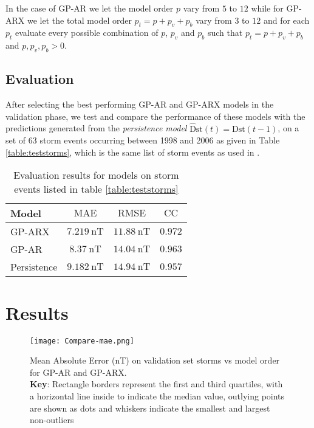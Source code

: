 In the case of GP-AR we let the model order $p$ vary from $5$ to $12$ while for GP-ARX we let the total model order $p_t = p + p_v + p_b$ vary from $3$ to $12$ and for each $p_t$ evaluate every possible combination of $p$, $p_v$ and $p_b$ such that $p_t = p + p_v + p_b$ and $p, p_{v}, p_b > 0$.


\subsection*{Evaluation}\label{sec:gpOSAEval}

After selecting the best performing GP-AR and GP-ARX models in the validation phase, we test and compare the performance of these models with the predictions generated from the \emph{persistence model} 
$\mathrm{\hat{D}st}(t) = \mathrm{Dst}(t-1)$, on a set of 63 storm events occurring between 1998 and 2006 as given in Table \ref{table:teststorms}, which is the same list of storm events as used in 
\citet{Ji2012}.


\begin{table}[h]
    \centering
    \caption{Evaluation results for models on storm events listed in table \ref{table:teststorms}}
    \label{table:results}
    \begin{tabular}{l c c c}
    \hline
    \textbf{Model} & $\mathrm{MAE}$ & $\mathrm{RMSE}$ & $\mathrm{CC}$\\ \hline
    GP-ARX & $\SI{7.219}{\nano\tesla}$ & $\SI{11.88}{\nano\tesla}$ & $0.972$\\
    GP-AR & $\SI{8.37}{\nano\tesla}$ & $\SI{14.04}{\nano\tesla}$ & $0.963$\\
    Persistence & $\SI{9.182}{\nano\tesla}$ & $\SI{14.94}{\nano\tesla}$ & $0.957$\\
    \hline
    \end{tabular}
\end{table}

\section{Results}\label{sec:res}

\begin{figure}
    \noindent\texttt{[image: Compare-mae.png]}
    \caption{Mean Absolute Error (\si{\nano\tesla}) on validation set storms vs model order for GP-AR and GP-ARX. \\ \textbf{Key}: Rectangle borders represent the first and third quartiles, with a horizontal line inside to indicate the median value, outlying points are shown as dots and whiskers indicate the smallest and largest non-outliers}
    \label{fig:CompareMae}
\end{figure}
    
